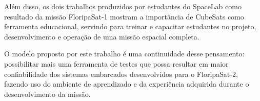 Além disso, os dois trabalhos produzidos por estudantes do SpaceLab como resultado da missão FloripaSat-1 mostram a importância de CubeSats como ferramenta educacional, servindo para treinar e capacitar estudantes no projeto, desenvolvimento e operação de uma missão espacial completa.

O modelo proposto por este trabalho é uma continuidade desse pensamento: possibilitar mais uma ferramenta de testes que possa resultar em maior confiabilidade dos sistemas embarcados desenvolvidos para o FloripaSat-2, fazendo uso do ambiente de aprendizado e da experiência adquirida durante o desenvolvimento da missão.


